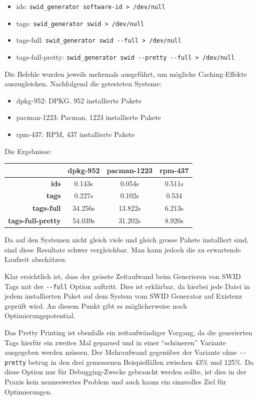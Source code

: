 \begin{itemize}
	\item ids: \texttt{swid\_generator software-id > /dev/null}
	\item tags: \texttt{swid\_generator swid > /dev/null}
	\item tags-full: \texttt{swid\_generator swid -{}-full > /dev/null}
	\item tags-full-pretty: \texttt{swid\_generator swid -{}-pretty -{}-full > /dev/null}
\end{itemize}

Die Befehle wurden jeweils mehrmals ausgeführt, um mögliche Caching-Effekte
auszugleichen. Nachfolgend die getesteten Systeme:

\begin{itemize}
	\item dpkg-952: DPKG, 952 installierte Pakete
	\item pacman-1223: Pacman, 1223 installierte Pakete
	\item rpm-437: RPM, 437 installierte Pakete
\end{itemize}

Die Ergebnisse:

\begin{tabularx}{\textwidth}{rCCC}
	& \textbf{dpkg-952} & \textbf{pacman-1223} & \textbf{rpm-437} \\
	\hline
	\textbf{ids} & 0.143s & 0.054s & 0.511s \\
	\hline
	\textbf{tags} & 0.227s & 0.102s & 0.534\\
	\hline
	\textbf{tags-full} & 34.256s & 13.822s & 6.213s \\
	\hline
	\textbf{tags-full-pretty} & 54.039s & 31.202s & 8.920s \\
	\hline
\end{tabularx}

\vspace{1.5em}

Da auf den Systemen nicht gleich viele und gleich grosse Pakete installiert
sind, sind diese Resultate schwer vergleichbar. Man kann jedoch die zu
erwartende Laufzeit abschätzen.

Klar ersichtlich ist, dass der grösste Zeitaufwand beim Generieren von SWID Tags
mit der \texttt{-{}-full} Option auftritt. Dies ist erklärbar, da hierbei jede
Datei in jedem installierten Paket auf dem System vom SWID Generator auf
Existenz geprüft wird. An diesem Punkt gibt es möglicherweise noch
Optimierungspotential.

Das Pretty Printing ist ebenfalls ein zeitaufwändiger Vorgang, da die
generierten Tags hierfür ein zweites Mal geparsed und in einer
\enquote{schöneren} Variante ausgegeben werden müssen. Der Mehraufwand gegenüber
der Variante ohne \texttt{-{}-pretty} betrug in den drei gemessenen
Beispielfällen zwischen 43\% und 125\%. Da diese Option nur für Debugging-Zwecke
gebraucht werden sollte, ist dies in der Praxis kein nenneswertes Problem und
auch kaum ein sinnvolles Ziel für Optimierungen.


